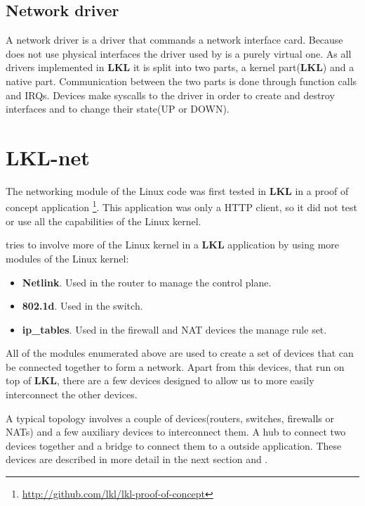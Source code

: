 \subsection{Network driver}
\label{sub-sec:net-driver}

A network driver is a driver that commands a network interface card. Because 
\textbf{\project} does not use physical interfaces
the driver used by \textbf{\project} is a purely virtual 
one. As all drivers implemented in \textbf{LKL} 
it is split into two parts, a kernel part(\textbf{LKL}) and 
a native part. Communication between the two parts
is done through function calls and IRQs.
Devices make syscalls to the driver in order to create and
destroy interfaces and to change their state(UP or DOWN).

\section{LKL-net}
\label{sec:lkl-net}

The networking module of the Linux code was first tested in \textbf{LKL} in a proof of concept application
\footnote{\url{http://github.com/lkl/lkl-proof-of-concept}}. This application was only a HTTP client, so
it did not test or use all the capabilities of the Linux kernel.

\textbf{\project} tries to involve more of the Linux kernel in a \textbf{LKL} application by using more modules
of the Linux kernel:
\begin{itemize}
  \item \textbf{Netlink}. Used in the router to manage the control plane.
  \item \textbf{802.1d}. Used in the switch.
  \item \textbf{ip_tables}. Used in the firewall and NAT devices the manage rule set.
\end{itemize}

All of the modules enumerated above are used to create a set of devices that can be connected together
to form a network. Apart from this devices, that run on top of \textbf{LKL}, there are a few devices designed
to allow us to more easily interconnect the other devices.

A typical \textbf{\project} topology involves a couple of devices(routers, switches, firewalls or NATs) and a few
auxiliary devices to interconnect them. A hub to connect two devices together and a bridge to connect them to
a outside application. These devices are described in more detail in the next section and .

